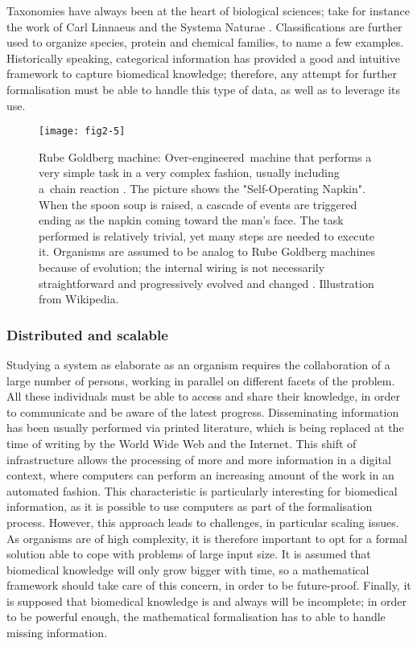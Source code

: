 Taxonomies have always been at the heart of biological sciences; take for instance the work of Carl Linnaeus and the Systema Naturae \citep{von1770systema}. Classifications are further used to organize species, protein and chemical families, to name a few examples. Historically speaking, categorical information has provided a good and intuitive framework to capture biomedical knowledge; therefore, any attempt for further formalisation must be able to handle this type of data, as well as to leverage its use.

\begin{figure}[ht]
    \centering
    \texttt{[image: fig2-5]}
    \caption{Rube Goldberg machine: Over-engineered machine that performs a very simple task in a very complex fashion, usually including a chain reaction \citep{rubewiki}. The picture shows the "Self-Operating Napkin". When the spoon soup is raised, a cascade of events are triggered ending as the napkin coming toward the man's face. The task performed is relatively trivial, yet many steps are needed to execute it. Organisms are assumed to be analog to Rube Goldberg machines because of evolution; the internal wiring is not necessarily straightforward and progressively evolved and changed \citep{ravasz2002hierarchical}. Illustration from Wikipedia.}
    \label{fig2-5}
\end{figure}

\subsubsection{Distributed and scalable}
\label{reqscale}

Studying a system as elaborate as an organism requires the collaboration of a large number of persons, working in parallel on different facets of the problem. All these individuals must be able to access and share their knowledge, in order to communicate and be aware of the latest progress. Disseminating information has been usually performed via printed literature, which is being replaced at the time of writing by the World Wide Web and the Internet. This shift of infrastructure allows the processing of more and more information in a digital context, where computers can perform an increasing amount of the work in an automated fashion. This characteristic is particularly interesting for biomedical information, as it is possible to use computers as part of the formalisation process. However, this approach leads to challenges, in particular scaling issues. As organisms are of high complexity, it is therefore important to opt for a formal solution able to cope with problems of large input size. It is assumed that biomedical knowledge will only grow bigger with time, so a mathematical framework should take care of this concern, in order to be future-proof. Finally, it is supposed that biomedical knowledge is and always will be incomplete; in order to be powerful enough, the mathematical formalisation has to able to handle missing information.

